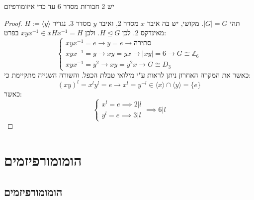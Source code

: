 \documentclass{tstextbook}
\begin{document}
\begin{proposition}
יש 2 חבורות מסדר 6 עד כדי איזומורפיזם

\end{proposition}
\begin{proof}
תהי \(|G|=G\). מקושי, יש בה איבר \(x\)  מסדר 2, ואיבר \(y\) מסדר 3. נגדיר \(H:=\langle y\rangle\) מאינדקס 2. לכן \(H\trianglelefteq G\). ולכן \(xyx ^{-1}\in xHx ^{-1}=H\)
בפרט:
$$\begin{cases}xyx^{-1} =e\to y=e\to \text{סתירה} \\xyx^{-1} =y\to xy=yx \to |xy|=6 \to G \cong \mathbb{Z}_{6} \\xyx^{-1} =y^2 \to xy=y^2x \to  G\cong D_{3}
\end{cases}$$
כאשר את המקרה האחרון ניתן לראות ע"י מילואי טבלת הכפל.
והשורה השנייה מתקיימת כי:
$$(xy)^l=x^ly^l=e\to x^l=y^{-l}\in \langle x\rangle \cap \langle y\rangle =\{ e \}$$
כאשר:
$$\begin{cases}x^l=e\implies 2|l \\y^l=e\implies 3|l
\end{cases}\implies 6|l$$

\end{proof}
\section{הומומורפיזמים}

\subsection{הומומורפיזמים}
\end{document}
